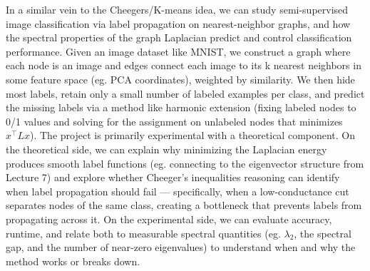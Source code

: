 \documentclass{article}
\theoremstyle{definition}
\theoremstyle{remark}
\begin{document}
In a similar vein to the Cheegers/K-means idea, we can study semi-supervised image classification via label propagation on nearest-neighbor graphs, and how the spectral properties of the graph Laplacian predict and control classification performance. Given an image dataset like MNIST, we construct a graph where each node is an image and edges connect each image to its k nearest neighbors in some feature space (eg. PCA coordinates), weighted by similarity. We then hide most labels, retain only a small number of labeled examples per class, and predict the missing labels via a method like harmonic extension (fixing labeled nodes to 0/1 values and solving for the assignment on unlabeled nodes that minimizes $x^\top Lx$). The project is primarily experimental with a theoretical component. On the theoretical side, we can explain why minimizing the Laplacian energy produces smooth label functions (eg. connecting to the eigenvector structure from Lecture 7) and explore whether Cheeger's inequalities reasoning can identify when label propagation should fail — specifically, when a low-conductance cut separates nodes of the same class, creating a bottleneck that prevents labels from propagating across it. On the experimental side, we can evaluate accuracy, runtime, and relate both to measurable spectral quantities (eg. $\lambda_2$, the spectral gap, and the number of near-zero eigenvalues) to understand when and why the method works or breaks down.
\end{document}
